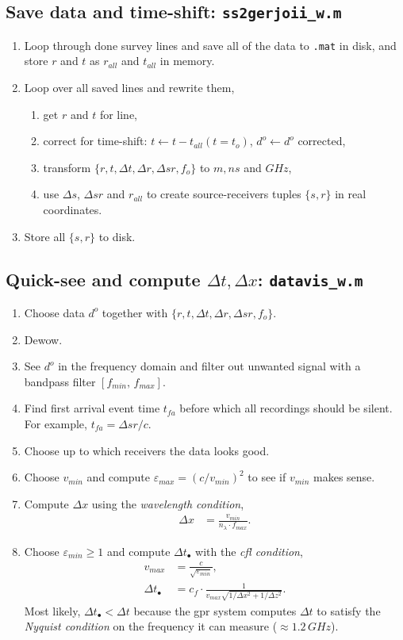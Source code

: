 \documentclass[a4paper,12pt]{article}
\begin{document}
\subsection*{Save data and time-shift: \texttt{ss2gerjoii\_w.m}}
\begin{enumerate}
\item Loop through done survey lines and save all of the data to \texttt{.mat} in disk, and store $r$ and $t$ as $r_{all}$ and $t_{all}$ in memory.
\item Loop over all saved lines and rewrite them,
\begin{enumerate}
\item get $r$ and $t$ for line,
\item correct for time-shift: $t\gets t-t_{all}(t=t_o)$, $d^o\gets d^o$ corrected,
\item transform $\{r,t,\Delta t,\Delta r,\Delta sr, f_o\}$ to $m,ns$ and $GHz$,
\item use $\Delta s$, $\Delta sr$ and $r_{all}$ to create source-receivers tuples $\{s,r\}$ in real coordinates.
\end{enumerate}
\item Store all $\{s,r\}$ to disk.
\end{enumerate}
%
\subsection*{Quick-see and compute $\Delta t,\Delta x$: \texttt{datavis\_w.m}}
\begin{enumerate}
\item Choose data $d^o$ together with $\{r,t,\Delta t,\Delta r,\Delta sr, f_o\}$.
\item Dewow.
\item See $d^o$ in the frequency domain and filter out unwanted signal with a bandpass filter $[f_{min},\, f_{max}]$.
\item Find first arrival event time $t_{fa}$ before which all recordings should be silent. For example, $t_{fa}=\Delta sr/c$.
\item Choose up to which receivers the data looks good.
\item Choose $v_{min}$ and compute $\varepsilon_{max} = (c/v_{min})^2$ to see if $v_{min}$ makes sense.
\item Compute $\Delta x$ using the {\it wavelength condition},
\begin{align}
\Delta x &= \frac{v_{min}}{n_\lambda\cdot f_{max}}.
\end{align}
\item Choose $\varepsilon_{min}\geq1$ and compute $\Delta t_\bullet$ with the {\it cfl condition},
\begin{align}
v_{max} &= \frac{c}{\sqrt{\varepsilon_{min}}},\\
 \Delta t_\bullet &= c_f \cdot \frac{1}{v_{max}\sqrt{1/\Delta x^2 + 1/\Delta z^2}}.
\end{align}
Most likely, $\Delta t_\bullet<\Delta t$ because the gpr system computes $\Delta t$ to satisfy the {\it Nyquist condition} on the frequency it can measure ($\approx 1.2\,GHz$). 
\end{enumerate}
%
%
\end{document}
